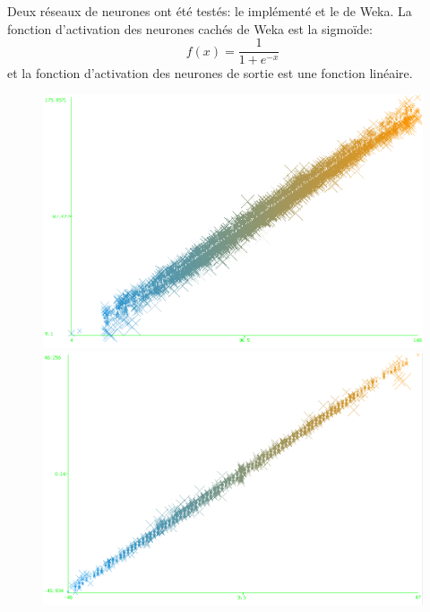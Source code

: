 Deux réseaux de neurones ont été testés: le \rbf implémenté et le \mlp de Weka.
La fonction d'activation des neurones cachés de Weka est la sigmoïde: 
\[ f(x) = \frac{1}{1+e^{-x}} \]
et la fonction d'activation des neurones de sortie est une fonction linéaire.\cite{mlpweka}

\begin{figure}
 \begin{minipage}[c]{\mpwekawidth}
  \includegraphics[width=\textwidth]{../figures/virtualResultSpeed.png}
 \end{minipage}
 \begin{minipage}[c]{\mpwekawidth}
  \includegraphics[width=\textwidth]{../figures/virtualHeadResult.png}
 \end{minipage}
 \label{we:virtualResult}
\end{figure}
